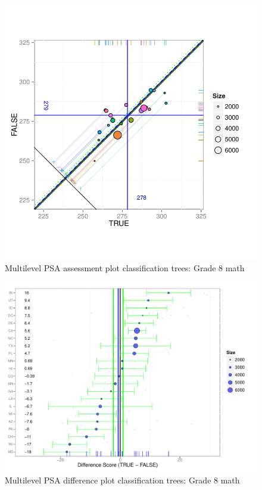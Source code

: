 \begin{figure}[h!]
\begin{center}
\includegraphics[width=\textwidth]{../Figures2009/g8math-mlpsa-ctree-circ.pdf}
\caption{Multilevel PSA assessment plot classification trees: Grade 8 math}
\end{center}
\end{figure}

\begin{figure}[h!]
\begin{center}
\includegraphics[width=\textwidth]{../Figures2009/g8math-mlpsa-ctree-diff.pdf}
\caption{Multilevel PSA difference plot classification trees: Grade 8 math}
\end{center}
\label{fig:g8math-mlpsa-ctree-diff}
\end{figure}

